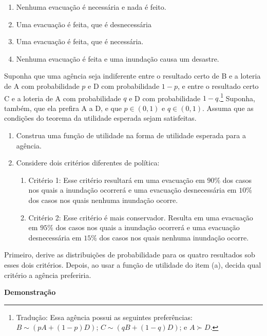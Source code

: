 \documentclass[12pt]{article}
\numberwithin{equation}{section}
\theoremstyle{plain}
\theoremstyle{definition}
\theoremstyle{remark}
\begin{document}
\begin{enumerate}
\def\labelenumi{(\Alph{enumi})}
\item
  Nenhuma evacuação é necessária e nada é feito.
\item
  Uma evacuação é feita, que é desnecessária
\item
  Uma evacuação é feita, que é necessária.
\item
  Nenhuma evacuação é feita e uma inundação causa um desastre.
\end{enumerate}

Suponha que uma agência seja indiferente entre o resultado certo de B e a loteria de A com probabilidade \(p\) e D com probabilidade \(1-p\), e entre o resultado certo C e a loteria de A com probabilidade \(q\) e D com probabilidade \(1-q\).\footnote{Tradução: Essa agência possui as seguintes preferências: \(B \sim \left(p A + (1-p) D\right)\); \(C \sim \left(q B + (1-q) D\right)\); e \(A \succ D\).} Suponha, também, que ela prefira A a D, e que \(p \in(0, 1)\) e \(q\in(0,1)\). Assuma que as condições do teorema da utilidade esperada sejam satisfeitas.

\begin{enumerate}
\def\labelenumi{(\alph{enumi})}
\tightlist
\item
  Construa uma função de utilidade na forma de utilidade esperada para a agência.
\item
  Considere dois critérios diferentes de política:

  \begin{enumerate}
  \def\labelenumii{\arabic{enumii})}
  \tightlist
  \item
    Critério 1: Esse critério resultará em uma evacuação em \(90\%\) dos casos nos quais a inundação ocorrerá e uma evacuação desnecessária em \(10\%\) dos casos nos quais nenhuma inundação ocorre.
  \item
    Critério 2: Esse critério é mais conservador. Resulta em uma evacuação em \(95\%\) dos casos nos quais a inundação ocorrerá e uma evacuação desnecessária em \(15\%\) dos casos nos quais nenhuma inundação ocorre.
  \end{enumerate}
\end{enumerate}

Primeiro, derive as distribuições de probabilidade para os quatro resultados sob esses dois critérios. Depois, ao usar a função de utilidade do item (a), decida qual critério a agência preferiria.

\textbf{Demonstração}
\end{document}
